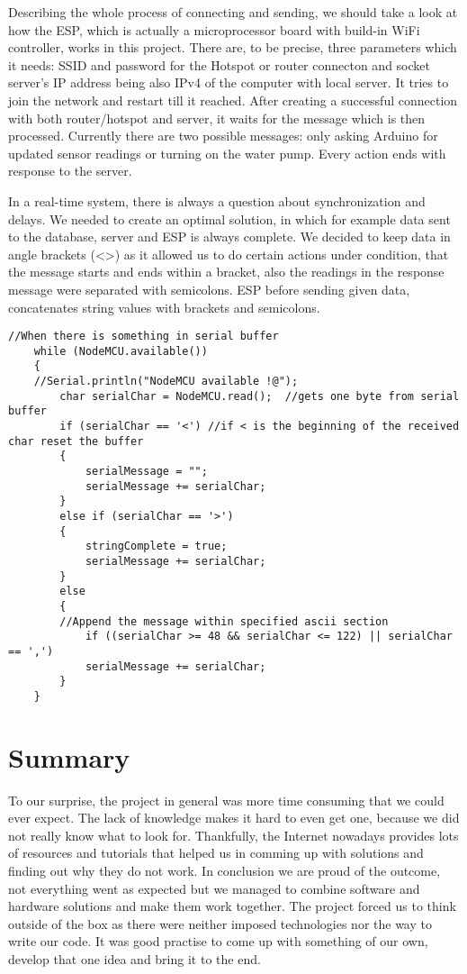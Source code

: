 \documentclass[oneside,a4paper,11pt]{report}
\begin{document}
\hspace{0.5cm}Describing the whole process of connecting and sending, we should take a look at how the ESP, which is actually a microprocessor board with build-in WiFi controller, works in this project. There are, to be precise, three parameters which it needs: SSID and password for the Hotspot or router connecton and socket server's IP address being also IPv4 of the computer with local server. It tries to join the network and restart till it reached. After creating a successful connection with both router/hotspot and server, it waits for the message which is then processed. Currently there are two possible messages: only asking Arduino for updated sensor readings or turning on the water pump. Every action ends with response to the server.\par
\hspace{0.5cm}In a real-time system, there is always a question about synchronization and delays. We needed to create an optimal solution, in which for example data sent to the database, server and ESP is always complete. We decided to keep data in angle brackets (<>) as it allowed us to do certain actions under condition, that the message starts and ends within a bracket, also the readings in the response message were separated with semicolons. ESP before sending given data, concatenates string values with brackets and semicolons.
\begin{lstlisting}[style=CStyle]
 //When there is something in serial buffer
	while (NodeMCU.available()) 
	{
	//Serial.println("NodeMCU available !@");
		char serialChar = NodeMCU.read();  //gets one byte from serial buffer
		if (serialChar == '<') //if < is the beginning of the received char reset the buffer
		{
			serialMessage = "";
			serialMessage += serialChar;
		}
		else if (serialChar == '>') 
		{
			stringComplete = true;
			serialMessage += serialChar;
		}
		else
		{
		//Append the message within specified ascii section 
			if ((serialChar >= 48 && serialChar <= 122) || serialChar == ',') 
			serialMessage += serialChar;
		}               
	}
\end{lstlisting}

\chapter{Summary}
\hspace{1cm}To our surprise, the project in general was more time consuming that we could ever expect. The lack of knowledge makes it hard to even get one, because we did not really know what to look for. Thankfully, the Internet nowadays provides lots of resources and tutorials that helped us in comming up with solutions and finding out why they do not work. In conclusion we are proud of the outcome, not everything went as expected but we managed to combine software and hardware solutions and make them work together. 
The project forced us to think outside of the box as there were neither imposed technologies nor the way to write our code. It was good practise to come up with something of our own, develop that one idea and bring it to the end. 
\end{document}
